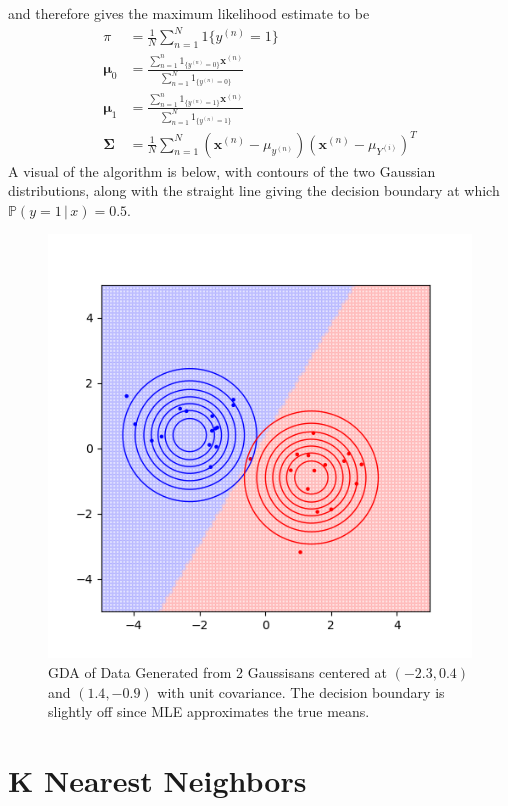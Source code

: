 \documentclass{article}
\theoremstyle{definition}
\begin{document}
  and therefore gives the maximum likelihood estimate to be 
  \begin{align*}
      \pi & = \frac{1}{N} \sum_{n=1}^N 1\{y^{(n)} = 1\} \\
      \boldsymbol{\mu}_0 & = \frac{\sum_{n=1}^n 1_{\{y^{(n)} = 0 \}} \mathbf{x}^{(n)}}{\sum_{n=1}^N 1_{\{y^{(n)} = 0 \}}} \\
      \boldsymbol{\mu}_1 & = \frac{\sum_{n=1}^n 1_{\{y^{(n)} = 1\}} \mathbf{x}^{(n)}}{\sum_{n=1}^N 1_{\{y^{(n)} = 1 \}}} \\
      \boldsymbol{\Sigma} & = \frac{1}{N} \sum_{n=1}^N (\mathbf{x}^{(n)} - \mu_{y^{(n)}}) (\mathbf{x}^{(n)} - \mu_{Y^{(i)}})^T 
  \end{align*}
  A visual of the algorithm is below, with contours of the two Gaussian distributions, along with the straight line giving the decision boundary at which $\mathbb{P}(y=1\,|\,x) = 0.5$. 
  \begin{figure}
      \centering
      \includegraphics[scale=0.7]{Section_3/GDA.png}
      \caption{GDA of Data Generated from 2 Gaussisans centered at $(-2.3, 0.4)$ and $(1.4, -0.9)$ with unit covariance. The decision boundary is slightly off since MLE approximates the true means. }
      \label{fig:gda}
  \end{figure}

\section{K Nearest Neighbors}      
\end{document}
